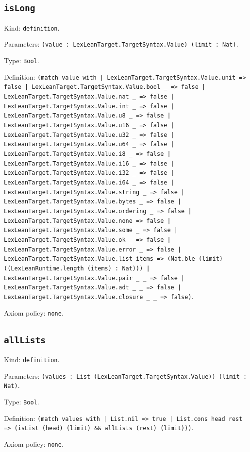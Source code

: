 \documentclass[11pt]{article}
\begin{document}
\subsection*{\texttt{isLong}}
\noindent Kind: \texttt{definition}.\par
\noindent Parameters: \texttt{(value : LexLeanTarget.TargetSyntax.Value) (limit : Nat)}.\par
\noindent Type: \texttt{Bool}.\par
\noindent Definition: \texttt{(match value with | LexLeanTarget.TargetSyntax.Value.unit => false | LexLeanTarget.TargetSyntax.Value.bool \_ => false | LexLeanTarget.TargetSyntax.Value.nat \_ => false | LexLeanTarget.TargetSyntax.Value.int \_ => false | LexLeanTarget.TargetSyntax.Value.u8 \_ => false | LexLeanTarget.TargetSyntax.Value.u16 \_ => false | LexLeanTarget.TargetSyntax.Value.u32 \_ => false | LexLeanTarget.TargetSyntax.Value.u64 \_ => false | LexLeanTarget.TargetSyntax.Value.i8 \_ => false | LexLeanTarget.TargetSyntax.Value.i16 \_ => false | LexLeanTarget.TargetSyntax.Value.i32 \_ => false | LexLeanTarget.TargetSyntax.Value.i64 \_ => false | LexLeanTarget.TargetSyntax.Value.string \_ => false | LexLeanTarget.TargetSyntax.Value.bytes \_ => false | LexLeanTarget.TargetSyntax.Value.ordering \_ => false | LexLeanTarget.TargetSyntax.Value.none => false | LexLeanTarget.TargetSyntax.Value.some \_ => false | LexLeanTarget.TargetSyntax.Value.ok \_ => false | LexLeanTarget.TargetSyntax.Value.error \_ => false | LexLeanTarget.TargetSyntax.Value.list items => (Nat.ble (limit) ((LexLeanRuntime.length (items) : Nat))) | LexLeanTarget.TargetSyntax.Value.pair \_ \_ => false | LexLeanTarget.TargetSyntax.Value.adt \_ \_ => false | LexLeanTarget.TargetSyntax.Value.closure \_ \_ => false)}.\par
\noindent Axiom policy: \texttt{none}.\par
\subsection*{\texttt{allLists}}
\noindent Kind: \texttt{definition}.\par
\noindent Parameters: \texttt{(values : List (LexLeanTarget.TargetSyntax.Value)) (limit : Nat)}.\par
\noindent Type: \texttt{Bool}.\par
\noindent Definition: \texttt{(match values with | List.nil => true | List.cons head rest => (isList (head) (limit) \&\& allLists (rest) (limit)))}.\par
\noindent Axiom policy: \texttt{none}.\par
\end{document}
